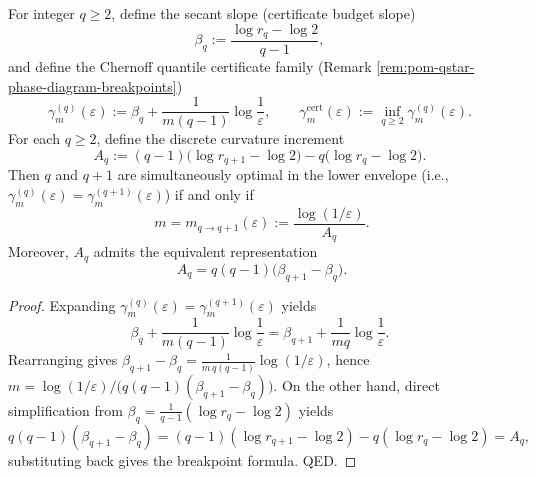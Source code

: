 
\begin{proposition}\label{prop:pom-breakpoint-curvature-law-Aq}
For integer \(q\ge 2\), define the secant slope (certificate budget slope)
\[
\beta_q:=\frac{\log r_q-\log 2}{q-1},
\]
and define the Chernoff quantile certificate family (Remark \ref{rem:pom-qstar-phase-diagram-breakpoints})
\[
\gamma_m^{(q)}(\varepsilon):=\beta_q+\frac{1}{m(q-1)}\log\frac{1}{\varepsilon},
\qquad
\gamma_m^{\mathrm{cert}}(\varepsilon):=\inf_{q\ge 2}\gamma_m^{(q)}(\varepsilon).
\]
For each \(q\ge 2\), define the discrete curvature increment
\[
\boxed{\;
A_q:=(q-1)\bigl(\log r_{q+1}-\log 2\bigr)-q\bigl(\log r_q-\log 2\bigr).\;}
\]
Then \(q\) and \(q+1\) are simultaneously optimal in the lower envelope (i.e., \(\gamma_m^{(q)}(\varepsilon)=\gamma_m^{(q+1)}(\varepsilon)\)) if and only if
\[
\boxed{\;
m=m_{q\to q+1}(\varepsilon):=\frac{\log(1/\varepsilon)}{A_q}.}
\]
Moreover, \(A_q\) admits the equivalent representation
\[
\boxed{\;
A_q=q(q-1)\bigl(\beta_{q+1}-\beta_q\bigr).}
\]
\end{proposition}
\begin{proof}
Expanding \(\gamma_m^{(q)}(\varepsilon)=\gamma_m^{(q+1)}(\varepsilon)\) yields
\[
\beta_q+\frac{1}{m(q-1)}\log\frac{1}{\varepsilon}
=
\beta_{q+1}+\frac{1}{mq}\log\frac{1}{\varepsilon}.
\]
Rearranging gives
\(
\beta_{q+1}-\beta_q=\frac{1}{m\,q(q-1)}\log(1/\varepsilon)
\), hence
\(
m=\log(1/\varepsilon)/\bigl(q(q-1)(\beta_{q+1}-\beta_q)\bigr)
\).
On the other hand, direct simplification from \(\beta_q=\frac{1}{q-1}(\log r_q-\log 2)\) yields
\[
q(q-1)(\beta_{q+1}-\beta_q)
=(q-1)(\log r_{q+1}-\log 2)-q(\log r_q-\log 2)
=A_q,
\]
substituting back gives the breakpoint formula. QED.
\end{proof}

